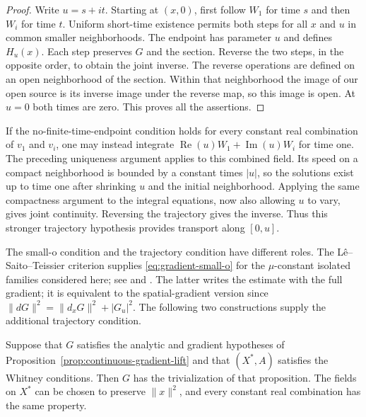 \begin{proof}
Write $u=s+it$.  Starting at $(x,0)$, first follow $W_1$ for time
$s$ and then $W_i$ for time $t$.  Uniform short-time existence permits
both steps for all $x$ and $u$ in common smaller neighborhoods.  The
endpoint has parameter $u$ and defines $H_u(x)$.  Each step preserves
$G$ and the section.  Reverse the two steps, in the opposite order,
to obtain the joint inverse.  The reverse operations are defined on
an open neighborhood of the section.  Within that neighborhood the
image of our open source is its inverse image under the reverse map,
so this image is open.  At $u=0$ both times are zero.  This
proves all the assertions.
\end{proof}

\begin{remark}
\label{rem:continuous-radial}
If the no-finite-time-endpoint condition holds for every constant real
combination of $v_1$ and $v_i$, one may instead integrate
$\operatorname{Re}(u)W_1+\operatorname{Im}(u)W_i$ for time one.
The preceding uniqueness argument applies to this combined field.
Its speed on a compact neighborhood is bounded by a constant times
$|u|$, so the solutions exist up to time one after shrinking $u$ and
the initial neighborhood.  Applying the same compactness argument to
the integral equations, now also allowing $u$ to vary, gives joint
continuity.  Reversing the trajectory gives the inverse.  Thus this
stronger trajectory hypothesis provides transport along $[0,u]$.
\end{remark}

The small-o condition and the trajectory condition have different
roles.  The L\^e--Saito--Teissier criterion \cite{LeSaito1973} supplies
\eqref{eq:gradient-small-o} for the $\mu$-constant isolated families
considered here; see \cite[Chapter~II, Remark~3.10]{Teissier1973} and
\cite[proof of Corollary~2.1, equation~(2.6)]{Parusinski1999}.
The latter writes the estimate with the full gradient; it is
equivalent to the spatial-gradient version since
$\|dG\|^2=\|d_xG\|^2+|G_u|^2$.
The following two constructions supply the additional trajectory
condition.

\begin{corollary}
\label{cor:gradient-whitney}
Suppose that $G$ satisfies the analytic and gradient hypotheses of
Proposition~\ref{prop:continuous-gradient-lift} and that $(X^*,A)$
satisfies the Whitney conditions.  Then $G$ has the trivialization
of that proposition.  The fields on $X^*$ can be chosen to preserve
$\|x\|^2$, and every constant real combination has the same property.
\end{corollary}

